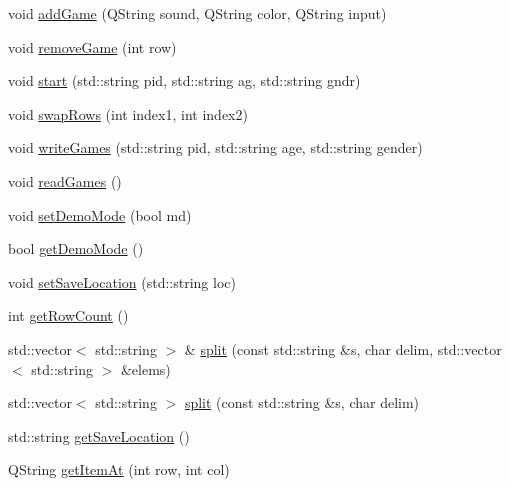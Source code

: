 \begin{DoxyCompactItemize}
\item 
void \hyperlink{class_trial_settings_model_ac6a2badb080c001eee725731918e5940}{add\+Game} (Q\+String sound, Q\+String color, Q\+String input)
\item 
void \hyperlink{class_trial_settings_model_a82883567708811acae2e0413a398ece5}{remove\+Game} (int row)
\item 
void \hyperlink{class_trial_settings_model_acf267171c19583954808dfbbf4d139e7}{start} (std\+::string pid, std\+::string ag, std\+::string gndr)
\item 
void \hyperlink{class_trial_settings_model_aaaf0d85602754b9f965ae6b248f20c89}{swap\+Rows} (int index1, int index2)
\item 
void \hyperlink{class_trial_settings_model_a2a9886471e3a978847919261010981af}{write\+Games} (std\+::string pid, std\+::string age, std\+::string gender)
\item 
void \hyperlink{class_trial_settings_model_abf028c54c71fb236ab7bdbda5ec6220a}{read\+Games} ()
\item 
void \hyperlink{class_trial_settings_model_a0f3690db59a0789e3625f9214151b3d5}{set\+Demo\+Mode} (bool md)
\item 
bool \hyperlink{class_trial_settings_model_a7de1f33a75eb321142bf561d017fe3a7}{get\+Demo\+Mode} ()
\item 
void \hyperlink{class_trial_settings_model_af7b1c0b43e04534f000f09db43baa188}{set\+Save\+Location} (std\+::string loc)
\item 
int \hyperlink{class_trial_settings_model_a48d6c2b8c99a0b177f304f1330ec96a1}{get\+Row\+Count} ()
\item 
std\+::vector$<$ std\+::string $>$ \& \hyperlink{class_trial_settings_model_ac3578447da475826046307ecbd92e0e0}{split} (const std\+::string \&s, char delim, std\+::vector$<$ std\+::string $>$ \&elems)
\item 
std\+::vector$<$ std\+::string $>$ \hyperlink{class_trial_settings_model_a283eb684102dedc1c82d36114e557481}{split} (const std\+::string \&s, char delim)
\item 
std\+::string \hyperlink{class_trial_settings_model_a02d6cb1012affee1bc4b5cc97c001268}{get\+Save\+Location} ()
\item 
Q\+String \hyperlink{class_trial_settings_model_a4da8630b29c5eedd094b5cf663890f9f}{get\+Item\+At} (int row, int col)
\end{DoxyCompactItemize}


